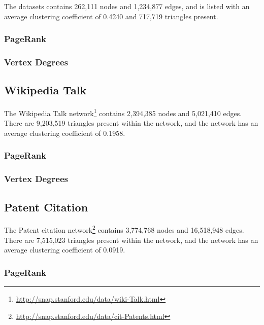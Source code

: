 The datasets contains 262,111 nodes and 1,234,877 edges, and is listed with an average clustering coefficient of 0.4240 and 717,719 triangles present.

\subsubsection{PageRank}

\subsubsection{Vertex Degrees}

\subsection{Wikipedia Talk}
The Wikipedia Talk network\footnote{\url{http://snap.stanford.edu/data/wiki-Talk.html}} contains 2,394,385 nodes and 5,021,410 edges. There are 9,203,519 triangles present within the network, and the network has an average clustering coefficient of 0.1958.

\subsubsection{PageRank}

\subsubsection{Vertex Degrees}

\subsection{Patent Citation}
The Patent citation network\footnote{\url{http://snap.stanford.edu/data/cit-Patents.html}} contains 3,774,768 nodes and 16,518,948 edges. There are 7,515,023 triangles present within the network, and the network has an average clustering coefficient of 0.0919.

\subsubsection{PageRank}

